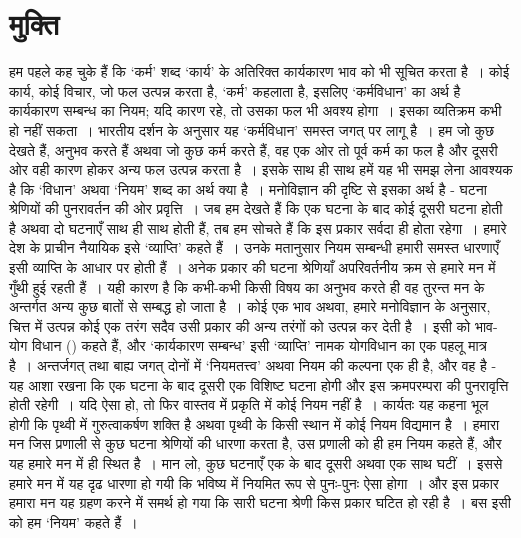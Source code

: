 
\chapter{मुक्ति}

हम पहले कह चुके हैं कि ‘कर्म’ शब्द ‘कार्य’ के अतिरिक्त कार्यकारण भाव को भी सूचित करता है~। कोई कार्य, कोई विचार, जो फल उत्पन्न करता है, ‘कर्म’ कहलाता है, इसलिए ‘कर्मविधान’ का अर्थ है कार्यकारण सम्बन्ध का नियम; यदि कारण रहे, तो उसका फल भी अवश्य होगा~। इसका व्यतिक्रम कभी हो नहीं सकता~। भारतीय दर्शन के अनुसार यह ‘कर्मविधान’ समस्त जगत् पर लागू है~। हम जो कुछ देखते हैं, अनुभव करते हैं अथवा जो कुछ कर्म करते हैं, वह एक ओर तो पूर्व कर्म का फल है और दूसरी ओर वही कारण होकर अन्य फल उत्पन्न करता है~। इसके साथ ही साथ हमें यह भी समझ लेना आवश्यक है कि ‘विधान’ अथवा ‘नियम’ शब्द का अर्थ क्या है~। मनोविज्ञान की दृष्टि से इसका अर्थ है - घटना श्रेणियों की पुनरावर्तन की ओर प्रवृत्ति~। जब हम देखते हैं कि एक घटना के बाद कोई दूसरी घटना होती है अथवा दो घटनाएँ साथ ही साथ होती हैं, तब हम सोचते हैं कि इस प्रकार सर्वदा ही होता रहेगा~। हमारे देश के प्राचीन नैयायिक इसे ‘व्याप्ति’ कहते हैं~। उनके मतानुसार नियम सम्बन्धी हमारी समस्त धारणाएँ इसी व्याप्ति के आधार पर होती हैं~। अनेक प्रकार की घटना श्रेणियाँ अपरिवर्तनीय क्रम से हमारे मन में गुँथी हुई रहती हैं~। यही कारण है कि कभी-कभी किसी विषय का अनुभव करते ही वह तुरन्त मन के अन्तर्गत अन्य कुछ बातों से सम्बद्ध हो जाता है~। कोई एक भाव अथवा, हमारे मनोविज्ञान के अनुसार, चित्त में उत्पन्न कोई एक तरंग सदैव उसी प्रकार की अन्य तरंगों को उत्पन्न कर देती है~। इसी को भाव-योग विधान () कहते हैं, और ‘कार्यकारण सम्बन्ध’ इसी ‘व्याप्ति’ नामक योगविधान का एक पहलू मात्र है~। अन्तर्जगत् तथा बाह्य जगत् दोनों में ‘नियमतत्त्व’ अथवा नियम की कल्पना एक ही है, और वह है - यह आशा रखना कि एक घटना के बाद दूसरी एक विशिष्ट घटना होगी और इस क्रमपरम्परा की पुनरावृत्ति होती रहेगी~। यदि ऐसा हो, तो फिर वास्तव में प्रकृति में कोई नियम नहीं है~। कार्यतः यह कहना भूल होगी कि पृथ्वी में गुरुत्वाकर्षण शक्ति है अथवा पृथ्वी के किसी स्थान में कोई नियम विद्यमान है~। हमारा मन जिस प्रणाली से कुछ घटना श्रेणियों की धारणा करता है, उस प्रणाली को ही हम नियम कहते हैं, और यह हमारे मन में ही स्थित है~। मान लो, कुछ घटनाएँ एक के बाद दूसरी अथवा एक साथ घटीं~। इससे हमारे मन में यह दृढ धारणा हो गयी कि भविष्य में नियमित रूप से पुनः-पुनः ऐसा होगा~। और इस प्रकार हमारा मन यह ग्रहण करने में समर्थ हो गया कि सारी घटना श्रेणी किस प्रकार घटित हो रही है~। बस इसी को हम ‘नियम’ कहते हैं~।

